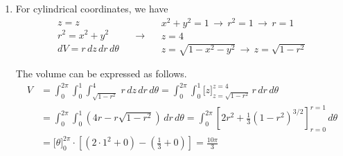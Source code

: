 \documentclass[a4paper, 12pt]{article}
\begin{document}
\begin{enumerate}[leftmargin=*,label=\textbf{\arabic*.}]
\begin{enumerate}[leftmargin=*,label=\textbf{\alph*.}]
In fact, we are looking for the minimum value of the upper bound for $\rho$ between $\displaystyle\frac1{\sin\phi}$ and $\displaystyle\frac4{\cos\phi}$. Hence, we can write the equivalent expression as follows.
\[\boxed{V=\displaystyle\int_0^{2\pi}\int_0^{\pi/2}\int_1^{\min\left(\textstyle\frac4{\cos\phi},\frac1{\sin\phi}\right)}\,\rho^2\sin\phi\,d\rho\,d\phi\,d\theta}\]

\item For cylindrical coordinates, we have
\[
\begin{array}{c}
z=z\\
r^2=x^2+y^2\\
dV=r\,dz\,dr\,d\theta
\end{array}\quad\rightarrow\quad
\begin{array}{c}
x^2+y^2=1\,\rightarrow\,r^2 = 1\,\rightarrow\,r=1\\
z=4\\
z=\sqrt{1-x^2-y^2}\,\rightarrow\,z=\sqrt{1-r^2}
\end{array}
\]

The volume can be expressed as follows.
\begin{align*}
    V&=\int_0^{2\pi}\int_0^1\int_{\sqrt{1-r^2}}^{4}\,r\,dz\,dr\,d\theta=\int_0^{2\pi}\int_0^1\big[z\big]_{z=\sqrt{1-r^2}}^{z=4}\,r\,dr\,d\theta\\[1em]&=\int_0^{2\pi}\int_0^1\left(4r-r\sqrt{1-r^2}\right)\,dr\,d\theta=\int_0^{2\pi}\left[2r^2 + \frac13\left(1-r^2\right)^{3/2}\right]_{r=0}^{r=1}\,d\theta\\[1em]&=\big[\theta\big]_0^{2\pi}\cdot\left[\left(2\cdot1^2 +0\right)-\left(\frac13+0\right)\right]=\boxed{\frac{10\pi}3}
\end{align*}
\end{enumerate}
\end{enumerate}

\newpage
{}
{}


\end{document}
